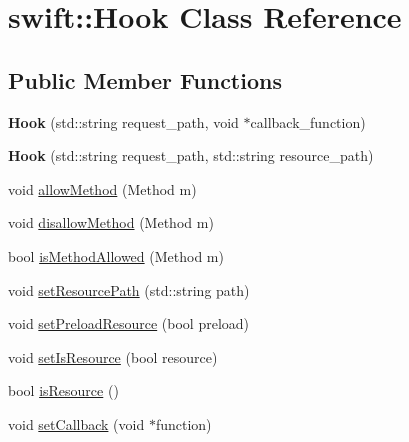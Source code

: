 \hypertarget{classswift_1_1_hook}{\section{swift\-:\-:Hook Class Reference}
\label{classswift_1_1_hook}
}
\subsection*{Public Member Functions}
\begin{DoxyCompactItemize}
\item 
\hypertarget{classswift_1_1_hook_aa394cd0e3d904efc13d1ec68f7fecb75}{{\bfseries Hook} (std\-::string request\-\_\-path, void $\ast$callback\-\_\-function)}\label{classswift_1_1_hook_aa394cd0e3d904efc13d1ec68f7fecb75}

\item 
\hypertarget{classswift_1_1_hook_a08e8c205418d4dc95a24ad10f0a6754e}{{\bfseries Hook} (std\-::string request\-\_\-path, std\-::string resource\-\_\-path)}\label{classswift_1_1_hook_a08e8c205418d4dc95a24ad10f0a6754e}

\item 
void \hyperlink{classswift_1_1_hook_ab8f2a030f4234be5aaea657628414669}{allow\-Method} (Method m)
\item 
void \hyperlink{classswift_1_1_hook_a02148f71598a14eb8c7f42d9c82f50cb}{disallow\-Method} (Method m)
\item 
bool \hyperlink{classswift_1_1_hook_ad5e71e832b6290d4f195a5dcd594e661}{is\-Method\-Allowed} (Method m)
\item 
void \hyperlink{classswift_1_1_hook_a4147575b0d54691515271508baa428c8}{set\-Resource\-Path} (std\-::string path)
\item 
void \hyperlink{classswift_1_1_hook_a8fc8a844df53bc651a46f9616ee635f9}{set\-Preload\-Resource} (bool preload)
\item 
void \hyperlink{classswift_1_1_hook_aeefe2c2e5080787975097a7c1b431161}{set\-Is\-Resource} (bool resource)
\item 
bool \hyperlink{classswift_1_1_hook_addbf2c39d6628c838b6fb46c96469e31}{is\-Resource} ()
\item 
void \hyperlink{classswift_1_1_hook_ad7bcbc0360bf438cef8eac374919495d}{set\-Callback} (void $\ast$function)
\end{DoxyCompactItemize}



